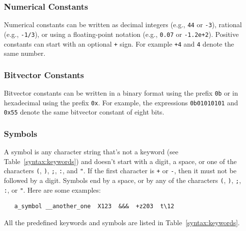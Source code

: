 \documentclass[11pt,twoside,fleqn,openright,titlepage]{cslreport}
\begin{document}
\subsubsection*{Numerical Constants}

Numerical  constants  can  be   written  as  decimal  integers  (e.g.,
\texttt{44} or \texttt{-3}), rational (e.g., \texttt{-1/3}), or using a
floating-point  notation  (e.g.,  \texttt{0.07} or  \texttt{-1.2e+2}).
Positive  constants can start  with an  optional \texttt{+}  sign. For
example \texttt{+4} and \texttt{4} denote the same number.


\subsubsection*{Bitvector Constants}

Bitvector constants can be written in a binary format using the prefix
\texttt{0b}  or  in  hexadecimal  using the  prefix  \texttt{0x}.  For
example, the expressions  \texttt{0b01010101} and \texttt{0x55} denote
the same bitvector constant of eight bits.

\subsubsection*{Symbols}

A  symbol  is   any  character  string  that's  not   a  keyword  (see
Table~\ref{syntax:keywords}) and doesn't start  with a digit, a space,
or   one  of  the   characters  \texttt{(},   \texttt{)},  \texttt{;},
\texttt{:}, and  \texttt{"}. If the  first character is  \texttt{+} or
\texttt{-}, then it must not be  followed by a digit. Symbols end by a
space, or by any of the characters \texttt{(}, \texttt{)}, \texttt{;},
\texttt{:}, or \texttt{"}. Here are some examples:
\begin{small}
\begin{verbatim}
   a_symbol __another_one  X123  &&&  +z203  t\12
\end{verbatim}
\end{small}
All   the   predefined   keywords    and   symbols   are   listed   in
Table~\ref{syntax:keywords}.
\end{document}
